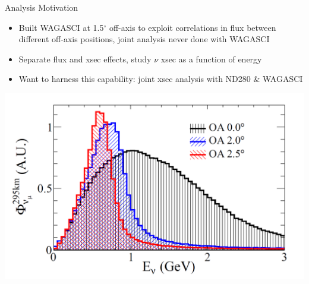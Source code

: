 \documentclass{beamer}
\begin{document}
\begin{frame}{Analysis Motivation}

\begin{itemize}
    \item Built WAGASCI at 1.5$^\circ$ off-axis to exploit correlations in flux between different off-axis positions, joint analysis never done with WAGASCI
    \item Separate flux and xsec effects, study ${\nu}$ xsec as a function of energy
    \item Want to harness this capability: joint xsec analysis with ND280 \& WAGASCI
\end{itemize}

\center 
\includegraphics[width=.7\textwidth]{images/figure-t2k-beam-off-axis.png}
\end{frame}
\end{document}
